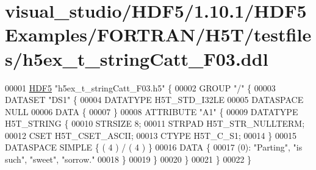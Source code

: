\hypertarget{visual__studio_2_h_d_f5_21_810_81_2_h_d_f5_examples_2_f_o_r_t_r_a_n_2_h5_t_2testfiles_2h5ex__t__string_catt___f03_8ddl_source}{}\section{visual\+\_\+studio/\+H\+D\+F5/1.10.1/\+H\+D\+F5\+Examples/\+F\+O\+R\+T\+R\+A\+N/\+H5\+T/testfiles/h5ex\+\_\+t\+\_\+string\+Catt\+\_\+\+F03.ddl}
\label{visual__studio_2_h_d_f5_21_810_81_2_h_d_f5_examples_2_f_o_r_t_r_a_n_2_h5_t_2testfiles_2h5ex__t__string_catt___f03_8ddl_source}

\begin{DoxyCode}
00001 \hyperlink{namespace_h_d_f5}{HDF5} \textcolor{stringliteral}{"h5ex\_t\_stringCatt\_F03.h5"} \{
00002 GROUP \textcolor{stringliteral}{"/"} \{
00003    DATASET \textcolor{stringliteral}{"DS1"} \{
00004       DATATYPE  H5T\_STD\_I32LE
00005       DATASPACE  NULL
00006       DATA \{
00007       \}
00008       ATTRIBUTE \textcolor{stringliteral}{"A1"} \{
00009          DATATYPE  H5T\_STRING \{
00010             STRSIZE 8;
00011             STRPAD H5T\_STR\_NULLTERM;
00012             CSET H5T\_CSET\_ASCII;
00013             CTYPE H5T\_C\_S1;
00014          \}
00015          DATASPACE  SIMPLE \{ ( 4 ) / ( 4 ) \}
00016          DATA \{
00017          (0): \textcolor{stringliteral}{"Parting"}, \textcolor{stringliteral}{"is such"}, \textcolor{stringliteral}{"sweet"}, \textcolor{stringliteral}{"sorrow."}
00018          \}
00019       \}
00020    \}
00021 \}
00022 \}
\end{DoxyCode}
